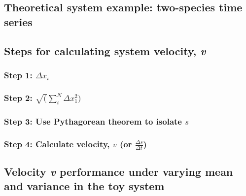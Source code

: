 \documentclass[12pt,twoside,openany]{reedthesis}
\begin{document}
\subsection{Theoretical system example: two-species time
series}\label{theoretical-system-example-two-species-time-series}

\subsection{\texorpdfstring{Steps for calculating system velocity,
\emph{v}}{Steps for calculating system velocity, v}}\label{steps-for-calculating-system-velocity-v}

\subsubsection{\texorpdfstring{Step 1:
\(\Delta x_i\)}{Step 1: \textbackslash{}Delta x\_i}}\label{step-1-delta-x_i}

\subsubsection{\texorpdfstring{Step 2:
\(\sqrt(\sum_i^N\Delta x_1^2)\)}{Step 2: \textbackslash{}sqrt(\textbackslash{}sum\_i\^{}N\textbackslash{}Delta x\_1\^{}2)}}\label{step-2-sqrtsum_indelta-x_12}

\subsubsection{\texorpdfstring{Step 3: Use Pythagorean theorem to
isolate
\(s\)}{Step 3: Use Pythagorean theorem to isolate s}}\label{step-3-use-pythagorean-theorem-to-isolate-s}

\subsubsection{\texorpdfstring{Step 4: Calculate velocity, \(v\) (or
\(\frac {\Delta s}{\Delta t}\))}{Step 4: Calculate velocity, v (or \textbackslash{}frac \{\textbackslash{}Delta s\}\{\textbackslash{}Delta t\})}}\label{step-4-calculate-velocity-v-or-frac-delta-sdelta-t}

\subsection{\texorpdfstring{Velocity \emph{v} performance under varying
mean and variance in the toy
system}{Velocity v performance under varying mean and variance in the toy system}}\label{velocity-v-performance-under-varying-mean-and-variance-in-the-toy-system}
\end{document}
